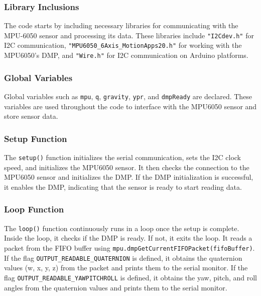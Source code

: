 \documentclass[conference]{IEEEtran}
\let\oldtexttt\texttt
\renewcommand{\texttt}[1]{\small\oldtexttt{#1}}
\begin{document}
\subsubsection{Library Inclusions}

The code starts by including necessary libraries for communicating with the MPU-6050 sensor and processing its data. These libraries include \texttt{"I2Cdev.h"} for I2C communication, \texttt{"MPU6050\_6Axis\_MotionApps20.h"} for working with the MPU6050's DMP, and \texttt{"Wire.h"} for I2C communication on Arduino platforms.\\

\subsubsection{Global Variables}

Global variables such as \texttt{mpu}, \texttt{q}, \texttt{gravity}, \texttt{ypr}, and \texttt{dmpReady} are declared. These variables are used throughout the code to interface with the MPU6050 sensor and store sensor data.\\

\subsubsection{Setup Function}

The \texttt{setup()} function initializes the serial communication, sets the I2C clock speed, and initializes the MPU6050 sensor. It then checks the connection to the MPU6050 sensor and initializes the DMP. If the DMP initialization is successful, it enables the DMP, indicating that the sensor is ready to start reading data.\\

\subsubsection{Loop Function}

The \texttt{loop()} function continuously runs in a loop once the setup is complete. Inside the loop, it checks if the DMP is ready. If not, it exits the loop. It reads a packet from the FIFO buffer using \texttt{mpu.dmpGetCurrentFIFOPacket(fifoBuffer)}. If the flag \texttt{OUTPUT\_READABLE\_QUATERNION} is defined, it obtains the quaternion values (w, x, y, z) from the packet and prints them to the serial monitor. If the flag \texttt{OUTPUT\_READABLE\_YAWPITCHROLL} is defined, it obtains the yaw, pitch, and roll angles from the quaternion values and prints them to the serial monitor.\\
\end{document}
